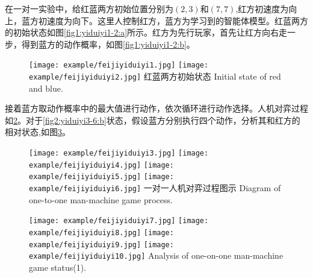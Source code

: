 在一对一实验中，给红蓝两方初始位置分别为$(2,3)$和$(7,7)$,红方初速度为向上，蓝方初速度为向下。这里人控制红方，蓝方为学习到的智能体模型。红蓝两方的初始状态如图\ref{fig1:yiduiyi1-2:a}所示。红方为先行玩家，首先让红方向右走一步，得到蓝方的动作概率，如图\ref{fig1:yiduiyi1-2:b}。


\begin{figure}[htpb]
	\centering
	\subcaptionbox{\label{fig1:yiduiyi1-2:a}}
	{\texttt{[image: example/feijiyiduiyi1.jpg]}}
	\subcaptionbox{\label{fig1:yiduiyi1-2:b}}
	{\texttt{[image: example/feijiyiduiyi2.jpg]}}
	\bicaption
	{红蓝两方初始状态}
	{Initial state of red and blue.}
	\label{fig1:yiduiyi1-2}
\end{figure}


接着蓝方取动作概率中的最大值进行动作，依次循环进行动作选择。人机对弈过程如\ref{fig2:yiduiyi3-6}。对于\ref{fig2:yiduiyi3-6:b}状态，假设蓝方分别执行四个动作，分析其和红方的相对状态,如图\ref{fig2:yiduiyi7-10}。

\begin{figure}[htp]
	\centering
	\subcaptionbox{\label{fig2:yiduiyi3-6:a}}
	{\texttt{[image: example/feijiyiduiyi3.jpg]}}
	\subcaptionbox{\label{fig2:yiduiyi3-6:b}}
	{\texttt{[image: example/feijiyiduiyi4.jpg]}}
	\newline
	\centering
	\subcaptionbox{\label{fig2:yiduiyi3-6:c}}
	{\texttt{[image: example/feijiyiduiyi5.jpg]}}
	\subcaptionbox{\label{fig2:yiduiyi3-6:d}}
	{\texttt{[image: example/feijiyiduiyi6.jpg]}}
	\bicaption
	{一对一人机对弈过程图示}
	{Diagram of one-to-one man-machine game process.}
	\label{fig2:yiduiyi3-6}
\end{figure}


\begin{figure}[htp]
	\centering
	{\texttt{[image: example/feijiyiduiyi7.jpg]}}
	\hspace{0.5em}
	{\texttt{[image: example/feijiyiduiyi8.jpg]}}
	\newline
	\centering
	{\texttt{[image: example/feijiyiduiyi9.jpg]}}
	\hspace{0.5em}
	{\texttt{[image: example/feijiyiduiyi10.jpg]}}
	{Analysis of one-on-one man-machine game status(1).}
	\label{fig2:yiduiyi7-10}
\end{figure}

